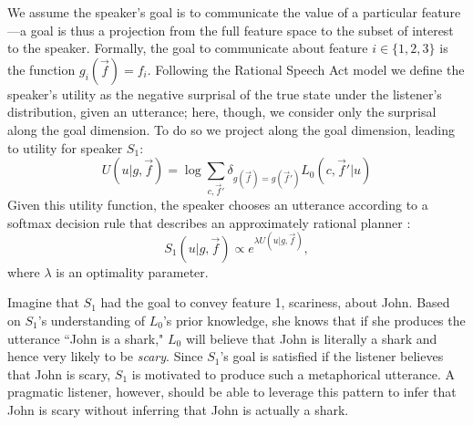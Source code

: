 \documentclass[10pt,letterpaper]{article}
\begin{document}
We assume the speaker's goal is to communicate the value of a particular feature---a goal is thus a projection from the full feature space to the subset of interest to the speaker. Formally, the goal to communicate about feature $i \in \{1,2,3\}$ is the function $g_i(\vec f) = f_i$. Following the Rational Speech Act model we define the speaker's utility as the negative surprisal of the true state under the listener's distribution, given an utterance; here, though, we consider only the surprisal along the goal dimension. 
To do so we project along the goal dimension, leading to utility for speaker $S_1$:
\begin{equation}
U(u | g, \vec f) = \log \sum_{c,\vec f'} \delta_{g(\vec f)=g(\vec f')} L_0(c, \vec f' |u)
\end{equation}
Given this utility function, the speaker chooses an utterance according to a softmax decision rule that describes an approximately rational planner \cite{sutton1998reinforcement}:
\begin{equation}
S_1(u | g, \vec f) \propto e^{\lambda U(u | g, \vec f)},
\end{equation}
where $\lambda$ is an optimality parameter. 

%

Imagine that $S_1$ had the goal to convey feature 1, scariness, about John.
Based on $S_1$'s understanding of $L_0$'s prior knowledge, she knows that if she produces the utterance ``John is a shark," $L_0$ will believe that John is literally a shark and hence very likely to be \emph{scary}. Since $S_1$'s goal is satisfied if the listener believes that John is scary, $S_1$ is motivated to produce such a metaphorical utterance. A pragmatic listener, however, should be able to leverage this pattern to infer that John is scary without inferring that John is actually a shark.
\end{document}

